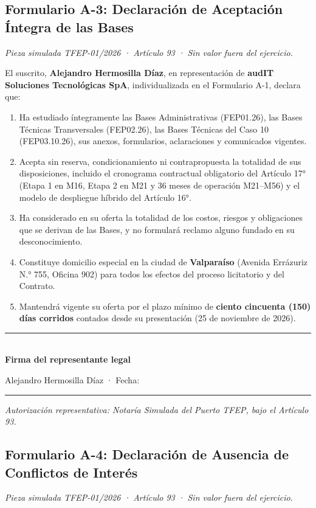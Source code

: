 \documentclass{audit-oferta}
\newcommand\rotuloSimuladoSobreUno{%
  \par\noindent\textit{Pieza simulada TFEP-01/2026 · Artículo 93 · Sin valor fuera del ejercicio.}\par\medskip}
\newcommand\lineaFirmaSobreUno{%
  \par\vspace{9mm}\noindent\rule{48mm}{0.4pt}\\
  \textbf{Firma del representante legal}\par}
\begin{document}
\noindent\begin{minipage}{\linewidth}
\subsection*{Formulario A-3: Declaración de Aceptación Íntegra de las Bases}\label{sec:s1-a3}
\rotuloSimuladoSobreUno

El suscrito, \textbf{Alejandro Hermosilla Díaz}, en representación de \textbf{audIT Soluciones Tecnológicas SpA}, individualizada en el Formulario A-1, declara que:

\begin{enumerate}
  \item Ha estudiado íntegramente las Bases Administrativas (FEP01.26), las Bases Técnicas Transversales (FEP02.26), las Bases Técnicas del Caso 10 (FEP03.10.26), sus anexos, formularios, aclaraciones y comunicados vigentes.
  \item Acepta sin reserva, condicionamiento ni contrapropuesta la totalidad de sus disposiciones, incluido el cronograma contractual obligatorio del Artículo 17° (Etapa 1 en M16, Etapa 2 en M21 y 36 meses de operación M21--M56) y el modelo de despliegue híbrido del Artículo 16°.
  \item Ha considerado en su oferta la totalidad de los costos, riesgos y obligaciones que se derivan de las Bases, y no formulará reclamo alguno fundado en su desconocimiento.
  \item Constituye domicilio especial en la ciudad de \textbf{Valparaíso} (Avenida Errázuriz N.° 755, Oficina 902) para todos los efectos del proceso licitatorio y del Contrato.
  \item Mantendrá vigente su oferta por el plazo mínimo de \textbf{ciento cincuenta (150) días corridos} contados desde su presentación (25 de noviembre de 2026).
\end{enumerate}

\lineaFirmaSobreUno
Alejandro Hermosilla Díaz · Fecha: \rule{25mm}{0.4pt}

\textit{Autorización representativa: Notaría Simulada del Puerto TFEP, bajo el Artículo 93.}
\label{sec:s1-a3-fin}
\end{minipage}\par

\clearpage

\subsection*{Formulario A-4: Declaración de Ausencia de Conflictos de Interés}\label{sec:s1-a4}
\rotuloSimuladoSobreUno
\end{document}
